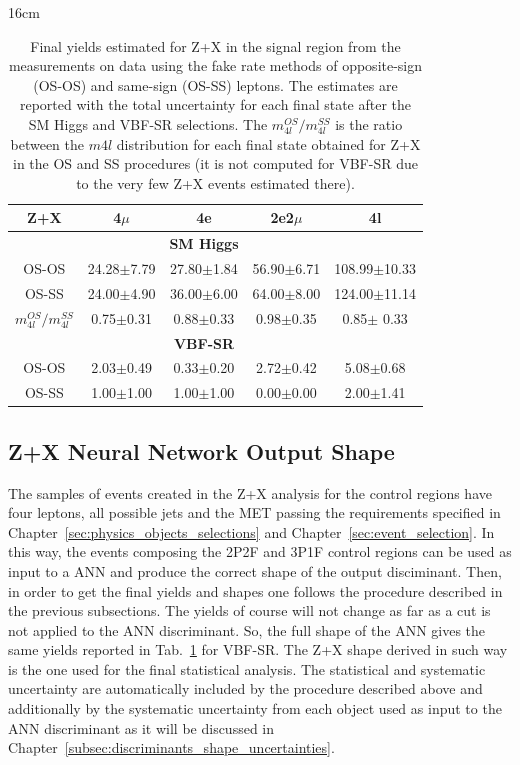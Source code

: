 \begin{table}[hbtp]{16cm}
	\centering
	\caption{Final yields estimated for Z+X in the signal region from the measurements on data using the fake rate methods of opposite-sign (OS-OS) and same-sign (OS-SS) leptons. The estimates are reported with the total uncertainty for each final state after the SM Higgs and VBF-SR selections. The $m_{4l}^{OS}/m_{4l}^{SS}$ is the ratio between the $m4l$ distribution for each final state obtained for Z+X in the OS and SS procedures (it is not computed for VBF-SR due to the very few Z+X events estimated there).}
	\begin{tabular}{c|c|c|c|c}
		\hline
		\rowcolor{light_gray}
		Z+X                       & 4$\mu$         & 4e                & 2e2$\mu$       & 4l\\
		\hline
		                          &                & \textbf{SM Higgs} &                &\\
		\hline
		OS-OS                     & 24.28$\pm$7.79 & 27.80$\pm$1.84    & 56.90$\pm$6.71 & 108.99$\pm$10.33\\
		OS-SS                     & 24.00$\pm$4.90 & 36.00$\pm$6.00    & 64.00$\pm$8.00 & 124.00$\pm$11.14\\
		$m_{4l}^{OS}/m_{4l}^{SS}$ &  0.75$\pm$0.31 &  0.88$\pm$0.33    &  0.98$\pm$0.35 &   0.85$\pm$ 0.33\\
		\hline
		                          &                & \textbf{VBF-SR}   &                &\\
		\hline
		OS-OS                     & 2.03$\pm$0.49  & 0.33$\pm$0.20     & 2.72$\pm$0.42  & 5.08$\pm$0.68\\
		OS-SS                     & 1.00$\pm$1.00  & 1.00$\pm$1.00     & 0.00$\pm$0.00  & 2.00$\pm$1.41\\
		\hline
	\end{tabular}
	\label{tab:final_zx_estimation}	
\end{table}


\subsection{Z+X Neural Network Output Shape}
The samples of events created in the Z+X analysis for the control regions have four leptons, all possible jets and the MET passing the requirements specified in Chapter~\ref{sec:physics_objects_selections} and Chapter~\ref{sec:event_selection}. In this way, the events composing the 2P2F and 3P1F control regions can be used as input to a ANN and produce the correct shape of the output disciminant. Then, in order to get the final yields and shapes one follows the procedure described in the previous subsections. The yields of course will not change as far as a cut is not applied to the ANN discriminant. So, the full shape of the ANN gives the same yields reported in Tab.~\ref{tab:final_zx_estimation} for VBF-SR. The Z+X shape derived in such way is the one used for the final statistical analysis. The statistical and systematic uncertainty are automatically included by the procedure described above and additionally by the systematic uncertainty from each object used as input to the ANN discriminant as it will be discussed in Chapter~\ref{subsec:discriminants_shape_uncertainties}.


